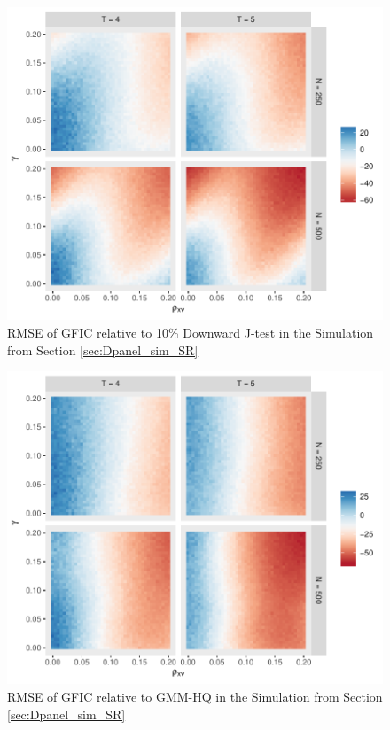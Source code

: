 \begin{figure}
\centering
\includegraphics[scale = 0.8]{./simulations/DynamicPanel/results/Dpanel_GFIC_RMSE_rel_J10}
\caption{RMSE of GFIC relative to 10\% Downward J-test in the Simulation from Section \ref{sec:Dpanel_sim_SR}}
\end{figure}

\begin{figure}
\centering
\includegraphics[scale = 0.8]{./simulations/DynamicPanel/results/Dpanel_GFIC_RMSE_rel_HQ}
\caption{RMSE of GFIC relative to GMM-HQ in the Simulation from Section \ref{sec:Dpanel_sim_SR}}
\end{figure}

